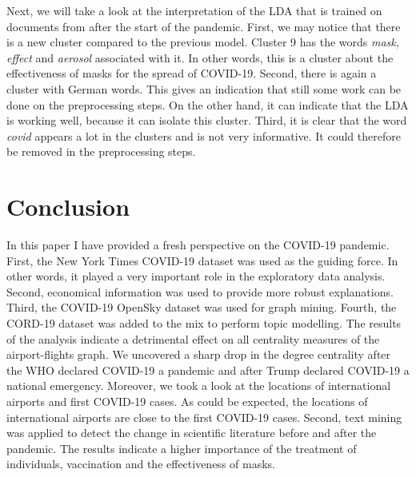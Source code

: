 \documentclass[10pt, a4paper, twocolumn]{article} %
\begin{document}
Next, we will take a look at the interpretation of the LDA that is trained on documents from after the start of the pandemic.
First, we may notice that there is a new cluster compared to the previous model. Cluster 9 has the words \textit{mask}, \textit{effect} and \textit{aerosol} associated with it. In other words, this is a cluster about the effectiveness of masks for the spread of COVID-19.
Second, there is again a cluster with German words. This gives an indication that still some work can be done on the preprocessing steps. On the other hand, it can indicate that the LDA is working well, because it can isolate this cluster.
Third, it is clear that the word \textit{covid} appears a lot in the clusters and is not very informative. It could therefore be removed in the preprocessing steps.

\section{Conclusion}

In this paper I have provided a fresh perspective on the COVID-19 pandemic. First, the New York Times COVID-19 dataset was used as the guiding force. In other words, it played a very important role in the exploratory data analysis. Second, economical information was used to provide more robust explanations. Third, the COVID-19 OpenSky dataset was used for graph mining. Fourth, the CORD-19 dataset was added to the mix to perform topic modelling.
The results of the analysis indicate a detrimental effect on all centrality measures of the airport-flights graph. We uncovered a sharp drop in the degree centrality after the WHO declared COVID-19 a pandemic and after Trump declared COVID-19 a national emergency. Moreover, we took a look at the locations of international airports and first COVID-19 cases. As could be expected, the locations of international airports are close to the first COVID-19 cases.
Second, text mining was applied to detect the change in scientific literature before and after the pandemic. The results indicate a higher importance of the treatment of individuals, vaccination and the effectiveness of masks.

\hspace{20px}

\hspace{20px}

\hspace{20px}

\hspace{20px}
\end{document}
